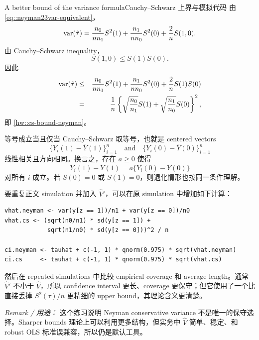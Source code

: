 \begin{exercisesolution}{A better bound of the variance formula}{Cauchy--Schwarz 上界与模拟代码}
由 \cref{eq::neyman23var-equivalent}，
\[
\textup{var}(\hat\tau)
=\frac{n_0}{nn_1}S^2(1)+\frac{n_1}{nn_0}S^2(0)+\frac{2}{n}S(1,0).
\]
由 Cauchy--Schwarz inequality，
\[
S(1,0)\leq S(1)S(0).
\]
因此
\begin{eqnarray*}
\textup{var}(\hat\tau)
&\leq&
\frac{n_0}{nn_1}S^2(1)+\frac{n_1}{nn_0}S^2(0)+\frac{2}{n}S(1)S(0)\\
&=&\frac{1}{n}\left\{
\sqrt{\frac{n_0}{n_1}}S(1)+
\sqrt{\frac{n_1}{n_0}}S(0)
\right\}^2,
\end{eqnarray*}
即 \cref{hw::cs-bound-neyman}。

等号成立当且仅当 Cauchy--Schwarz 取等号，也就是 centered vectors
\[
\{Y_i(1)-\bar Y(1)\}_{i=1}^n
\quad\text{and}\quad
\{Y_i(0)-\bar Y(0)\}_{i=1}^n
\]
线性相关且方向相同。换言之，存在 $a\geq0$ 使得
\[
Y_i(1)-\bar Y(1)=a\{Y_i(0)-\bar Y(0)\}
\]
对所有 $i$ 成立。若 $S(0)=0$ 或 $S(1)=0$，则退化情形也按同一条件理解。

要重复正文 simulation 并加入 $\hat V'$，可以在原 simulation 中增加如下计算：
\begin{lstlisting}
vhat.neyman <- var(y[z == 1])/n1 + var(y[z == 0])/n0
vhat.cs <- (sqrt(n0/n1) * sd(y[z == 1]) +
            sqrt(n1/n0) * sd(y[z == 0]))^2 / n

ci.neyman <- tauhat + c(-1, 1) * qnorm(0.975) * sqrt(vhat.neyman)
ci.cs     <- tauhat + c(-1, 1) * qnorm(0.975) * sqrt(vhat.cs)
\end{lstlisting}
然后在 repeated simulations 中比较 empirical coverage 和 average length。通常 $\hat V'$ 不小于 $\hat V$，所以 confidence interval 更长、coverage 更保守；但它使用了一个比直接丢掉 $S^2(\tau)/n$ 更精细的 upper bound，其理论含义更清楚。

\emph{Remark / 用途：} 这个练习说明 Neyman conservative variance 不是唯一的保守选择。Sharper bounds 理论上可以利用更多结构，但实务中 $\hat V$ 简单、稳定、和 robust OLS 标准误兼容，所以仍是默认工具。
\end{exercisesolution}

